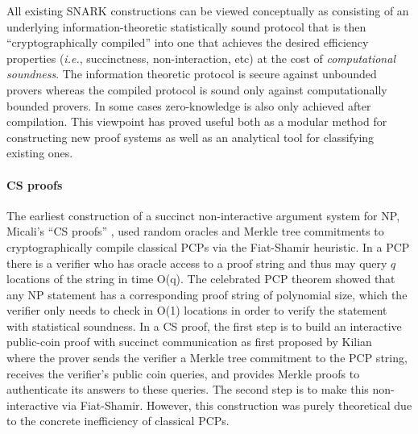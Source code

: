 
All existing SNARK constructions can be viewed conceptually as consisting of an underlying information-theoretic statistically sound protocol that is then “cryptographically compiled” into one that achieves the desired efficiency properties (\emph{i.e.}, succinctness, non-interaction, etc) at the cost of \emph{computational soundness}. The information theoretic protocol is secure against unbounded provers whereas the compiled protocol is sound only against computationally bounded provers. In some cases zero-knowledge is also only achieved after compilation. This viewpoint has proved useful both as a modular method for constructing new proof systems as well as an analytical tool for classifying existing ones. 

\paragraph{CS proofs} The earliest construction of a succinct non-interactive argument system for NP, Micali’s ``CS proofs” \cite{CSproofs}, used random oracles and Merkle tree commitments to cryptographically compile classical PCPs via the Fiat-Shamir heuristic. In a PCP there is a verifier who has oracle access to a proof string and thus may query $q$ locations of the string in time O(q). The celebrated PCP theorem \cite{FOCS:ALMSS92} showed that any NP statement has a corresponding proof string of polynomial size, which the verifier only needs to check in O(1) locations in order to verify the statement with statistical soundness. In a CS proof, the first step is to build an interactive public-coin proof with succinct communication as first proposed by Kilian ~\cite{STOC:Kilian92} where the prover sends the verifier a Merkle tree commitment to the PCP string, receives the verifier’s public coin queries, and provides Merkle proofs to authenticate its answers to these queries. The second step is to make this non-interactive via Fiat-Shamir. However, this construction was purely theoretical due to the concrete inefficiency of classical PCPs. 

